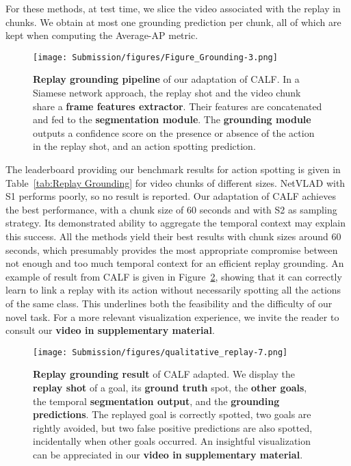 \documentclass[final]{cvsports}
\begin{document}
For these methods, at test time, we slice the video associated with the replay in chunks. We obtain at most one grounding prediction per chunk, all of which are kept when computing the Average-AP metric. 
 

\begin{figure}
    \centering
    \texttt{[image: Submission/figures/Figure\_Grounding-3.png]}
    \caption{\textbf{Replay grounding pipeline} of our adaptation of CALF. In a Siamese network approach, the replay shot and the video chunk share a \textcolor{newanthoorangespotting}{\textbf{frame features extractor}}. Their features are concatenated and fed to the \textcolor{newanthobluespotting}{\textbf{segmentation module}}. The \textcolor{newanthogreenspotting}{\textbf{grounding module}} outputs a confidence score on the presence or absence of the action in the replay shot, and an action spotting prediction.}
    \label{fig:replay-grounding}
\end{figure}

The leaderboard providing our benchmark results for action spotting is given in Table~\ref{tab:Replay Grounding} for video chunks of different sizes. NetVLAD with S1 performs poorly, so no result is reported. 
Our adaptation of CALF achieves the best performance, with a chunk size of 60 seconds and with S2 as sampling strategy. Its demonstrated ability to aggregate the temporal context may explain this success. All the methods yield their best results with chunk sizes around 60 seconds, which presumably provides the most appropriate compromise between not enough and too much temporal context for an efficient replay grounding. An example of result from CALF is given in Figure~\ref{fig:result-replay-grounding}, showing that it can correctly learn to link a replay with its action without necessarily spotting all the actions of the same class. This underlines both the feasibility and the difficulty of our novel task. For a more relevant visualization experience, we invite the reader to consult our \textbf{video in supplementary material}.



\begin{figure}
    \centering
    \texttt{[image: Submission/figures/qualitative\_replay-7.png]}
    \caption{\textbf{Replay grounding result} of CALF adapted. We display the \textcolor{newanthoredreplay}{\textbf{replay shot}} of a goal, its \textcolor{newanthobluespotting}{\textbf{ground truth}} spot, the \textcolor{newanthopinkreplay}{\textbf{other goals}}, the temporal \textcolor{newanthoorangespotting}{\textbf{segmentation output}}, and the \textcolor{newanthogreenspotting}{\textbf{grounding predictions}}. The replayed goal is correctly spotted, two goals are rightly avoided, but two false positive predictions are also spotted, incidentally when other goals occurred. An insightful visualization can be appreciated in our \textbf{video in supplementary material}.}
    \label{fig:result-replay-grounding}
\end{figure}
\end{document}
